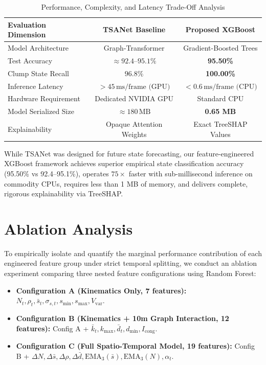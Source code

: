 \documentclass[conference]{IEEEtran}
\begin{document}
\begin{table}[htbp]
\caption{Performance, Complexity, and Latency Trade-Off Analysis}
\label{tab:complexity_tradeoff}
\centering
\begin{tabular}{lcc}
\toprule
\textbf{Evaluation Dimension} & \textbf{TSANet Baseline \cite{kumar2024tsanet}} & \textbf{Proposed XGBoost} \\
\midrule
Model Architecture & Graph-Transformer & Gradient-Boosted Trees \\
Test Accuracy & $\approx 92.4$--$95.1\%$ & \textbf{95.50\%} \\
Clump State Recall & $96.8\%$ & \textbf{100.00\%} \\
Inference Latency & $> 45\,\text{ms/frame (GPU)}$ & \textbf{$< 0.6\,\text{ms/frame (CPU)}$} \\
Hardware Requirement & Dedicated NVIDIA GPU & Standard CPU \\
Model Serialized Size & $\approx 180\,\text{MB}$ & \textbf{0.65 MB} \\
Explainability & Opaque Attention Weights & Exact TreeSHAP Values \\
\bottomrule
\end{tabular}
\end{table}

While TSANet was designed for future state forecasting, our feature-engineered XGBoost framework achieves superior empirical state classification accuracy (95.50\% vs 92.4--95.1\%), operates $75\times$ faster with sub-millisecond inference on commodity CPUs, requires less than 1 MB of memory, and delivers complete, rigorous explainability via TreeSHAP.

\section{Ablation Analysis}

To empirically isolate and quantify the marginal performance contribution of each engineered feature group under strict temporal splitting, we conduct an ablation experiment comparing three nested feature configurations using Random Forest:
\begin{itemize}
    \item \textbf{Configuration A (Kinematics Only, 7 features):} $N_t, \rho_t, \bar{s}_t, \sigma_{s,t}, s_{\min}, s_{\max}, V_{\text{var}}$.
    \item \textbf{Configuration B (Kinematics + 10m Graph Interaction, 12 features):} Config A + $\bar{k}_t, k_{\max}, \bar{d}_t, d_{\min}, I_{\text{cong}}$.
    \item \textbf{Configuration C (Full Spatio-Temporal Model, 19 features):} Config B + $\Delta N, \Delta \bar{s}, \Delta \rho, \Delta \bar{d}, \text{EMA}_3(\bar{s}), \text{EMA}_3(N), \alpha_t$.
\end{itemize}
\end{document}
